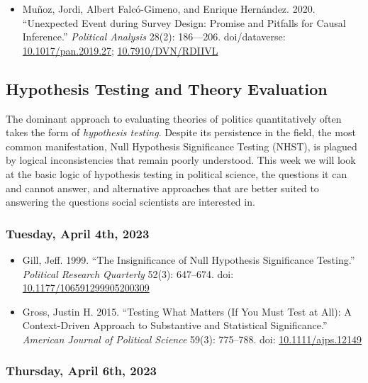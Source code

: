 \documentclass[12pt,]{article}
\providecommand{\tightlist}{%
  \setlength{\itemsep}{0pt}\setlength{\parskip}{0pt}}
\begin{document}
\begin{itemize}
\tightlist
\item
  Muñoz, Jordi, Albert Falcó-Gimeno, and Enrique Hernández. 2020.
  ``Unexpected Event during Survey Design: Promise and Pitfalls for
  Causal Inference.'' \emph{Political Analysis} 28(2): 186---206.
  doi/dataverse:
  \href{https://doi.org/10.1017/pan.2019.27}{10.1017/pan.2019.27};
  \href{https://doi.org/10.7910/DVN/RDIIVL}{10.7910/DVN/RDIIVL}
\end{itemize}

\hypertarget{hypothesis-testing-and-theory-evaluation}{%
\subsection{Hypothesis Testing and Theory
Evaluation}\label{hypothesis-testing-and-theory-evaluation}}

\noindent The dominant approach to evaluating theories of politics
quantitatively often takes the form of \emph{hypothesis testing}.
Despite its persistence in the field, the most common manifestation,
Null Hypothesis Significance Testing (NHST), is plagued by logical
inconsistencies that remain poorly understood. This week we will look at
the basic logic of hypothesis testing in political science, the
questions it can and cannot answer, and alternative approaches that are
better suited to answering the questions social scientists are
interested in.

\hypertarget{tuesday-april-4th-2023}{%
\subsubsection{Tuesday, April 4th, 2023}\label{tuesday-april-4th-2023}}

\begin{itemize}
\item
  Gill, Jeff. 1999. ``The Insignificance of Null Hypothesis Significance
  Testing.'' \emph{Political Research Quarterly} 52(3): 647--674. doi:
  \href{https://doi.org/10.1177/106591299905200309}{10.1177/106591299905200309}
\item
  Gross, Justin H. 2015. ``Testing What Matters (If You Must Test at
  All): A Context-Driven Approach to Substantive and Statistical
  Significance.'' \emph{American Journal of Political Science} 59(3):
  775--788. doi:
  \href{https://doi.org/10.1111/ajps.12149}{10.1111/ajps.12149}
\end{itemize}

\hypertarget{thursday-april-6th-2023}{%
\subsubsection{Thursday, April 6th,
2023}\label{thursday-april-6th-2023}}
\end{document}

